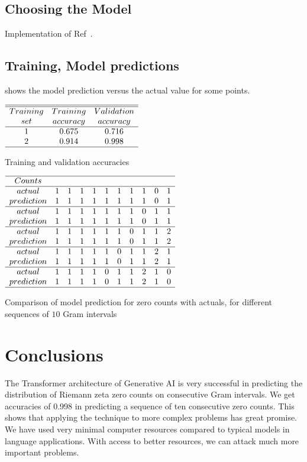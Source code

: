 \documentclass[twoside]{article}
\begin{document}
\subsection{\label{sec3.1} Choosing the Model}
Implementation of Ref~\cite{BenjaminEtienne}.

\subsection{\label{relation}Training,  Model predictions}

shows the model prediction versus the actual value for some points.

\begin{table}
\centering \(\begin{array}{ccc}
\hline
\hline
Training  & Training &Validation  \\
set     &accuracy&accuracy\\
\hline
1  & 0.675 & 0.716 \\

2  & 0.914 & 0.998 \\
\hline
\end{array}\)
\caption{Training and validation accuracies}
\label{tab:accuracies}
\end{table}

\begin{table}
\centering \(\begin{array}{ccccccccccc}
\hline
Counts& \\
\hline
actual     &1&1&1&1&1&1&1&1&0&1\\
prediction &1&1&1&1&1&1&1&1&0&1\\
\hline
actual     &1&1&1&1&1&1&1&0&1&1\\
prediction &1&1&1&1&1&1&1&0&1&1\\
\hline
actual     &1&1&1&1&1&1&0&1&1&2\\
prediction &1&1&1&1&1&1&0&1&1&2\\
\hline
actual     &1&1&1&1&1&0&1&1&2&1\\
prediction &1&1&1&1&1&0&1&1&2&1\\
\hline
actual     &1&1&1&1&0&1&1&2&1&0\\
prediction &1&1&1&1&0&1&1&2&1&0\\
\hline
\end{array}\)
\caption{Comparison of model prediction for zero counts with actuals, for different sequences of $10$ Gram intervals} 
\label{tab:perf}
\end{table}

\section{\label{conclusions}Conclusions}
The Transformer architecture of Generative AI is very successful in predicting the distribution of Riemann zeta zero counts on consecutive Gram intervals. We get accuracies of 0.998
in predicting a sequence of ten consecutive zero counts. This shows that applying the technique to more complex problems has great promise. We have used very minimal computer resources compared to typical models in language applications. With access to better resources, we can attack much more important problems.
\end{document}
